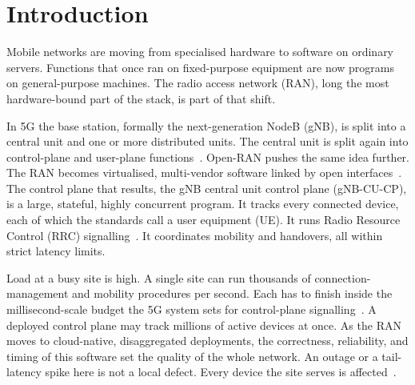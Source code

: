 \documentclass[english,oneside,a4paper,censored,csm,software-track-2020]{HYthesisML}
\begin{document}
\chapter{Introduction}

Mobile networks are moving from specialised hardware to software on ordinary servers.
Functions that once ran on fixed-purpose equipment are now programs on general-purpose
machines. The radio access network (RAN), long the most hardware-bound part of the stack, is
part of that shift.

In 5G the base station, formally the next-generation NodeB (gNB), is split into a central
unit and one or more distributed units. The central unit is split again into control-plane and
user-plane functions~\cite{3gpp38401,3gpp38300}. Open-RAN pushes the same idea further. The RAN
becomes virtualised, multi-vendor software linked by open interfaces~\cite{polese2023oran}. The
control plane that results, the gNB central unit control plane (gNB-CU-CP), is a large,
stateful, highly concurrent program. It tracks every connected device, each of which the
standards call a user equipment (UE). It runs Radio Resource Control (RRC)
signalling~\cite{3gpp38331}. It coordinates mobility and handovers, all within strict latency
limits.

Load at a busy site is high. A single site can run thousands of connection-management and
mobility procedures per second. Each has to finish inside the millisecond-scale budget the 5G
system sets for control-plane signalling~\cite{3gpp38913}. A deployed control plane may track
millions of active devices at once. As the RAN moves to cloud-native, disaggregated
deployments, the correctness, reliability, and timing of this software set the quality of the
whole network. An outage or a tail-latency spike here is not a local defect. Every device the
site serves is affected~\cite{dean2013tail,barroso2017microseconds}.
\end{document}
